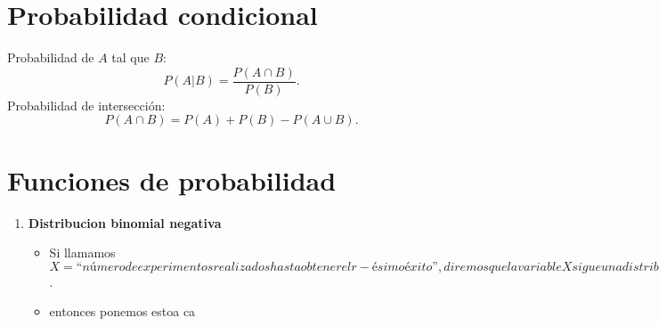 \documentclass{article}
\begin{document}
\section*{Probabilidad condicional}
Probabilidad de \( A \) tal que \( B \):
\[
P(A|B) = \frac{P(A \cap B)}{P(B)}
.\] 
Probabilidad de intersección:
\[
    P(A \cap B) = P(A) + P(B) - P(A \cup B)
.\] 
\section*{Funciones de probabilidad}
\begin{enumerate}
    \item \textbf{Distribucion binomial negativa}
        \begin{itemize}
            \item Si llamamos \(X = “número de experimentos realizados hasta obtener el r-ésimo éxito”, diremos que la variable X sigue una distribución binomial negativa de parámetros r, p\).  
            \item entonces ponemos estoa ca
        \end{itemize}
\end{enumerate}
\end{document}
